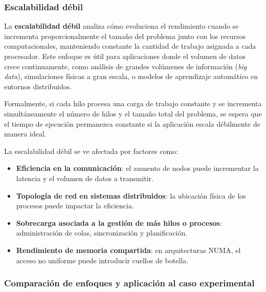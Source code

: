         \subsubsection{Escalabilidad débil}

            La \textbf{escalabilidad débil} analiza cómo evoluciona el rendimiento cuando se incrementa proporcionalmente el tamaño del problema junto con los recursos computacionales, manteniendo constante la cantidad de trabajo asignada a cada procesador. Este enfoque es útil para aplicaciones donde el volumen de datos crece continuamente, como análisis de grandes volúmenes de información (\textit{big data}), simulaciones físicas a gran escala, o modelos de aprendizaje automático en entornos distribuidos.
            
            Formalmente, si cada hilo procesa una carga de trabajo constante y se incrementa simultáneamente el número de hilos y el tamaño total del problema, se espera que el tiempo de ejecución permanezca constante si la aplicación escala débilmente de manera ideal.
            
            La escalabilidad débil se ve afectada por factores como:
            
            \begin{itemize}
            
                \item \textbf{Eficiencia en la comunicación}: el aumento de nodos puede incrementar la latencia y el volumen de datos a transmitir.
                
                \item \textbf{Topología de red en sistemas distribuidos}: la ubicación física de los procesos puede impactar la eficiencia.
                
                \item \textbf{Sobrecarga asociada a la gestión de más hilos o procesos}: administración de colas, sincronización y planificación.
                
                \item \textbf{Rendimiento de memoria compartida}: en arquitecturas NUMA, el acceso no uniforme puede introducir cuellos de botella.
                
            \end{itemize}

        \subsubsection{Comparación de enfoques y aplicación al caso experimental}
        
